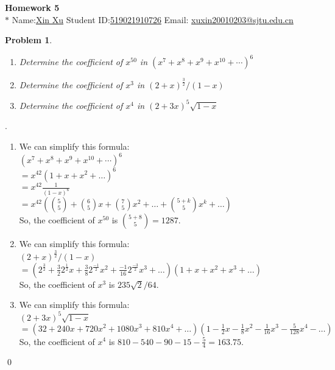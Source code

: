 \documentclass[12pt]{article}
\date{Feb 14, 2012}
\newtheorem{hw}{Problem}
\newenvironment{sol}
  {\par\vspace{3mm}\noindent{\it Solution}.}
  {\qed}
\begin{document}
\begin{center}
{\LARGE\bf Homework 5}\\
\vspace{2mm}
\footnotesize{$*$ Name:\underline{Xin Xu}  \quad Student ID:\underline{519021910726} \quad Email: \underline{xuxin20010203@sjtu.edu.cn}}
\vspace{2mm}
\end{center}


\begin{hw}
  \begin{enumerate}
    \item  Determine the coefficient of $x^{50}$ in $(x^7+x^8+x^9+x^{10}+\cdots)^6$
    \item  Determine the coefficient of $x^3$ in $(2+x)^{\frac{3}{2}}/(1-x)$
    \item  Determine the coefficient of $x^4$ in $(2+3x)^{5}\sqrt{1-x}$
  \end{enumerate}
\end{hw}

\begin{sol}
    \begin{enumerate}
        \item We can simplify this formula:
        \\$(x^7+x^8+x^9+x^{10}+\cdots)^6$
        \\$=x^{42}(1+x+x^2+\ldots )^6$
        \\$=x^{42}\frac{1}{(1-x)^6}$
        \\$=x^{42}(\binom{5}{5}+\binom{6}{5}x+\binom{7}{5}x^2+\ldots +\binom{5+k}{5}x^k+\ldots )$
        \\So, the coefficient of $x^50$ is $\binom{5+8}{5}=1287 $.
        \item We can simplify this formula:
        \\$(2+x)^{\frac{3}{2}}/(1-x)$
        \\$=(2^\frac{3}{2}+\frac{3}{2}2^\frac{1}{2}x+\frac{3}{8}2^\frac{-1}{2}x^2+\frac{-1}{16}2^\frac{-3}{2}x^3+\ldots)(1+x+x^2+x^3+\ldots)$
        \\So, the coefficient of $x^3$ is $235\sqrt{2}/64$.
        \item We can simplify this formula:
        \\$(2+3x)^{5}\sqrt{1-x}$
        \\$=(32+240x+720x^2+1080x^3+810x^4+\ldots)(1-\frac{1}{2}x-\frac{1}{8}x^2-\frac{1}{16}x^3-\frac{5}{128}x^4-\ldots)$
        \\So, the coefficient of $x^4$ is $810-540-90-15-\frac{5}{4}=163.75$.
    \end{enumerate}
\end{sol}
\end{document}
